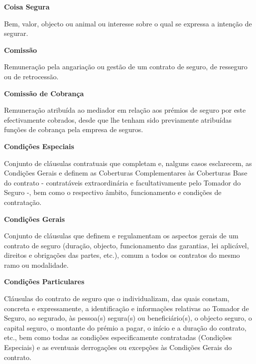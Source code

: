 \begin{description}
\item \textbf{Coisa Segura}

Bem, valor, objecto ou animal ou interesse sobre o qual se expressa a intenção de segurar.\end{description}

\begin{description}
\item \textbf{Comissão}

Remuneração pela angariação ou gestão de um contrato de seguro, de resseguro ou de retrocessão.\end{description}

\begin{description}
\item \textbf{Comissão de Cobrança}

Remuneração atribuída ao mediador em relação aos prémios de seguro por este efectivamente cobrados, desde que lhe tenham sido previamente atribuídas funções de cobrança pela empresa de seguros.
\end{description}

\begin{description}
\item \textbf{Condições Especiais}

Conjunto de cláusulas contratuais que completam e, nalguns casos esclarecem, as Condições Gerais e definem as Coberturas Complementares às Coberturas Base do contrato - contratáveis extraordinária e facultativamente pelo Tomador do Seguro -, bem como o respectivo âmbito, funcionamento e condições de contratação.
\end{description}

\begin{description}
\item \textbf{Condições Gerais}

Conjunto de cláusulas que definem e regulamentam os aspectos gerais de um contrato de seguro (duração, objecto, funcionamento das garantias, lei aplicável, direitos e obrigações das partes, etc.), comum a todos os contratos do mesmo ramo ou modalidade.
\end{description}

\begin{description}
\item \textbf{Condições Particulares}

Cláusulas do contrato de seguro que o individualizam, das quais constam, concreta e expressamente, a identificação e informações relativas ao Tomador de Seguro, ao segurado, às pessoa(s) segura(s) ou beneficiário(s), o objecto seguro, o capital seguro, o montante do prémio a pagar, o início e a duração do contrato, etc., bem como todas as condições especificamente contratadas (Condições Especiais) e as eventuais derrogações ou excepções às Condições Gerais do contrato.
\end{description}

